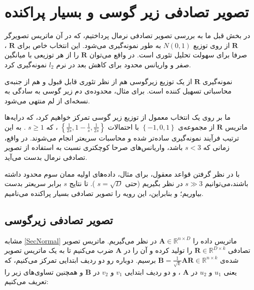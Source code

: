 
\section{
تصویر تصادفی زیر گوسی و بسیار پراکنده
}

در بخش قبل ما به بررسی تصویر تصادفی نرمال پرداختیم، که در آن ماتریس تصویرگر 
$\mathbf{R}$
از روی توزیع 
$N(0,1)$
به طور 
نمونه‌گیری می‌شود. این انتخاب خاص برای 
$\mathbf{R}$
، صرفا برای سهولت تحلیل تئوری است. در واقع می‌توان 
$\mathbf{R}$
را از هر توزیعی با میانگین صفر و واریانس محدود برای کاهش بعد در نرم 
$l_2$
نمونه‌گیری کرد.

نمونه‌گیری
$\mathbf{R}$
از یک توزیع زیرگوسی
هم از نظر تئوری قابل قبول و هم از جنبه‌ی محاسباتی تسهیل کننده است. برای مثال، محدوده‌ی دم زیر گوسی به سادگی به نسخه‌ای از لم
منتهی می‌شود. 

ما بر روی یک انتخاب معمول از توزیع زیر گوسی تمرکز خواهیم کرد، که درایه‌ها ماتریس 
$\mathbf{R}$
از مجموعه‌ی 
$\left\{ -1, 0, 1 \right\}$
با احتمالات 
$\left\{ \frac{1}{2s}, 1 - \frac{1}{s}, \frac{1}{2s} \right\}$
، که 
$s \geq 1$
. به این ترتیب فرآیند نمونه‌گیری ساده‌تر شده و محاسبات سریعتر انجام می‌شوند. در واقع، زمانی که 
$s < 3$
باشد، واریانس‌های صرحا کوچکتری نسبت به استفاده از تصویر تصادفی نرمال بدست می‌آید.

با در نظر گرفتن قواعد معقول، برای مثال، داده‌های اولیه ممان سوم محدود داشته باشند،می‌توانیم 
$s \gg 3$
در نظر بگیریم (حتی 
$s = \sqrt{D}$
).
تا نتایج 
$s$
برابر سریعتر بدست بیاوریم؛ و بنابراین، این رویه را تصویر تصادفی بسیار پراکنده می‌نامیم.


\subsection{
تصویر تصادفی زیرگوسی
}

مشابه
\autoref{SecNormal}
ماتریس داده را 
$\mathbf{A} \in \mathbb{R}^{n \times D}$
در نظر می‌گیریم. ماتریس تصویر تصادفی 
$\mathbf{R} \in \mathbb{R}^{D \times k}$
را تولید کرده و آن را در 
$\mathbf{A}$
ضرب می‌کنیم تا به یک ماتریس تصویر شده‌‌ی 
$\mathbf{B} = \frac{1}{\sqrt{k}} \mathbf{AR} \in \mathbb{R}^{n \times k}$
برسیم. دوباره رو دو ردیف ابتدایی تمرکز می‌کنیم، که یعنی 
$u_1$
و 
$u_2$
در 
$\mathbf{A}$
، و دو ردیف ابتدایی 
$v_1$
و 
$v_2$
در 
$\mathbf{B}$
و همچنین تساوی‌های زیر را تعریف می‌کنیم:


